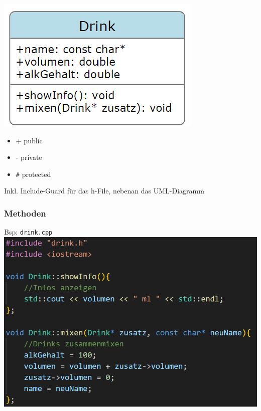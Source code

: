             \begin{minipage}{0.3\linewidth}
                \includegraphics[width=0.95\linewidth]{Bilder/cpp_klassen-hfile-uml.png}
            \end{minipage}
            \begin{minipage}{0.2\linewidth}
                \begin{itemize}
                    \item + public
                    \item - private
                    \item \verb|#| protected
                \end{itemize}
            \end{minipage}
            
            Inkl. Include-Guard für das h-File, nebenan das UML-Diagramm

        \subsubsection{Methoden}
            Bsp: \verb|drink.cpp| \\
            \includegraphics[width=0.7\linewidth]{Bilder/cpp_klassen-hfile-methoden.png}
            
